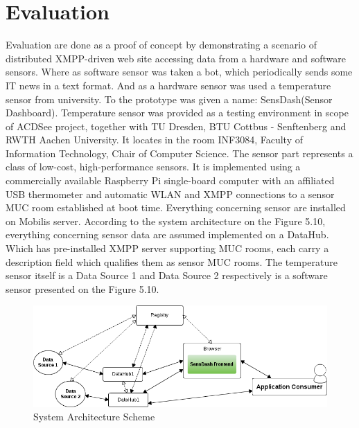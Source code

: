 \section{Evaluation}
Evaluation are done as a proof of concept by demonstrating a scenario of distributed XMPP-driven web site accessing data from a hardware and software sensors. Where as software sensor was taken a bot, which periodically sends some IT news in a text format. And as a hardware sensor was used a temperature sensor from university. To the prototype was given a name: SensDash(Sensor Dashboard). Temperature sensor was provided as a testing environment in scope of ACDSee project, together with TU Dresden, BTU Cottbus - Senftenberg and RWTH Aachen University. It locates in the room INF3084, Faculty of Information Technology, Chair of Computer Science. The sensor part represents a class of low-cost, high-performance sensors. It is implemented using a commercially available Raspberry Pi single-board computer with an affiliated USB thermometer and automatic WLAN and XMPP connections to a sensor MUC room established at boot time. Everything concerning sensor are installed on Mobilis server. According to the system architecture on the Figure 5.10, everything concerning sensor data are assumed implemented on a DataHub. Which has pre-installed XMPP server supporting MUC rooms, each carry a description field which qualifies them as sensor MUC rooms. The temperature sensor itself is a Data Source 1 and Data Source 2 respectively is a software sensor  presented on the Figure 5.10.
        \begin{figure}[!ht]
		\centering
		\includegraphics[scale=0.6]{images/UseCaseScheme1.png}   
		\caption[Use Case System Architecture Scheme]{System Architecture Scheme}                         
		\end{figure}

